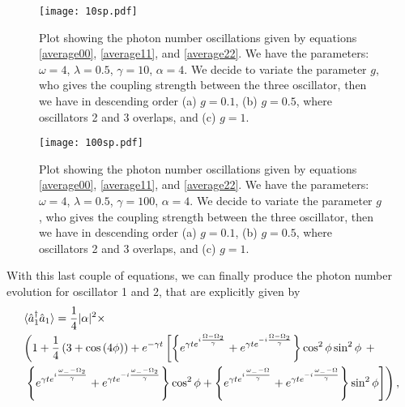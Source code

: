\documentclass{article}
\newcommand{\op}[1]{\hat{#1}}
\begin{document}
\begin{figure}[htbp]
    \centering
    \texttt{[image: 10sp.pdf]}
    \caption{Plot showing the photon number oscillations given by equations \eqref{average00}, \eqref{average11}, and \eqref{average22}. We have the parameters: $\omega = 4$, $\lambda = 0.5$, $\gamma = 10$, $\alpha=4$. We decide to variate the parameter $g$, who gives the coupling strength between the three oscillator, then we have in descending order (a) $g=0.1$, (b) $g=0.5$, where oscillators 2 and 3 overlaps, and (c) $g=1$.}
    \label{fig:expect1}
\end{figure}

\begin{figure}[htbp]
    \centering
    \texttt{[image: 100sp.pdf]}
    \caption{Plot showing the photon number oscillations given by equations \eqref{average00}, \eqref{average11}, and \eqref{average22}. We have the parameters: $\omega = 4$, $\lambda = 0.5$, $\gamma = 100$, $\alpha=4$. We decide to variate the parameter $g$, who gives the coupling strength between the three oscillator, then we have in descending order (a) $g=0.1$, (b) $g=0.5$, where oscillators 2 and 3 overlaps, and (c) $g=1$.}
    \label{fig:expect2}
\end{figure}

With this last couple of equations, we can finally produce the photon number evolution for oscillator 1 and 2, that are explicitly given by
\begin{equation}\label{average11}
\begin{aligned}
    &\braket{\op{a}_{1}^{\dagger}{\op{a}_{1}}} = \frac{1}{4}|\alpha|^{2}\times\\
    & \left(1 + \frac{1}{4}\left(3+\cos\left(4\phi\right)\right) + e^{-\gamma t}\left[\left\{e^{\gamma t e^{i\frac{\Omega-\Omega_{2}}{\gamma}}}+e^{\gamma t e^{-i\frac{\Omega-\Omega_{2}}{\gamma}}}\right\}\cos^{2}\phi\sin^{2}\phi\right.\right. +\\
    & \left.\left.\left\{e^{\gamma t e^{i\frac{\omega_{-}-\Omega_{2}}{\gamma}}}+e^{\gamma t e^{-i\frac{\omega_{-}-\Omega_{2}}{\gamma}}}\right\}\cos^{2}\phi + \left\{e^{\gamma t e^{i\frac{\omega_{-}-\Omega}{\gamma}}}+e^{\gamma t e^{-i\frac{\omega_{-}-\Omega}{\gamma}}}\right\}\sin^{2}\phi\right]\right),
\end{aligned}
\end{equation}
\end{document}
